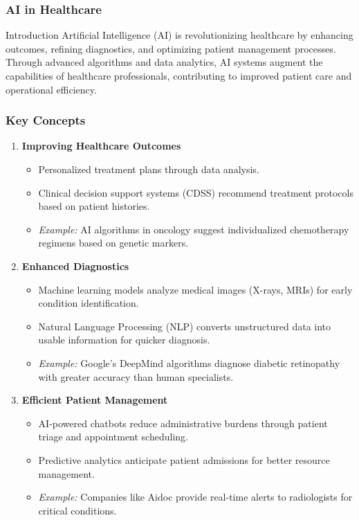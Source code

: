 \documentclass[aspectratio=169]{beamer}
\begin{document}
\begin{frame}[fragile]
    \frametitle{AI in Healthcare}
    \begin{block}{Introduction}
        Artificial Intelligence (AI) is revolutionizing healthcare by enhancing outcomes, refining diagnostics, and optimizing patient management processes. Through advanced algorithms and data analytics, AI systems augment the capabilities of healthcare professionals, contributing to improved patient care and operational efficiency.
    \end{block}
\end{frame}

\begin{frame}[fragile]
    \frametitle{Key Concepts}
    \begin{enumerate}
        \item \textbf{Improving Healthcare Outcomes}
            \begin{itemize}
                \item Personalized treatment plans through data analysis.
                \item Clinical decision support systems (CDSS) recommend treatment protocols based on patient histories.
                \item \textit{Example:} AI algorithms in oncology suggest individualized chemotherapy regimens based on genetic markers.
            \end{itemize}

        \item \textbf{Enhanced Diagnostics}
            \begin{itemize}
                \item Machine learning models analyze medical images (X-rays, MRIs) for early condition identification.
                \item Natural Language Processing (NLP) converts unstructured data into usable information for quicker diagnosis.
                \item \textit{Example:} Google’s DeepMind algorithms diagnose diabetic retinopathy with greater accuracy than human specialists.
            \end{itemize}

        \item \textbf{Efficient Patient Management}
            \begin{itemize}
                \item AI-powered chatbots reduce administrative burdens through patient triage and appointment scheduling.
                \item Predictive analytics anticipate patient admissions for better resource management.
                \item \textit{Example:} Companies like Aidoc provide real-time alerts to radiologists for critical conditions.
            \end{itemize}
    \end{enumerate}
\end{frame}
\end{document}
